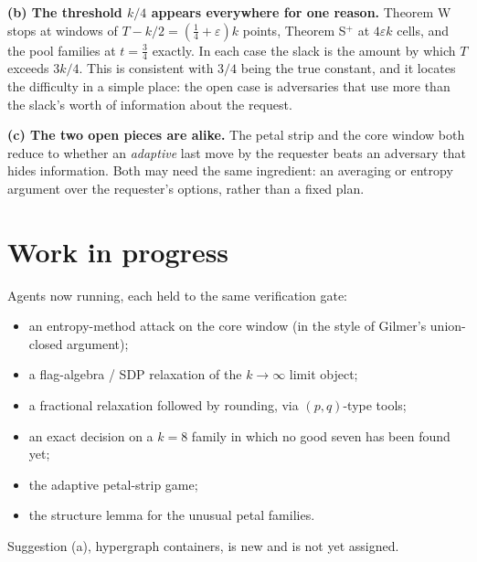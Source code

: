 \documentclass[11pt]{article}
\begin{document}
\textbf{(b) The threshold $k/4$ appears everywhere for one reason.} Theorem W stops at windows of $T-k/2=(\tfrac14+
\varepsilon)k$ points, Theorem S$^+$ at $4\varepsilon k$ cells, and the pool families at $t=\tfrac34$ exactly. In each
case the slack is the amount by which $T$ exceeds $3k/4$. This is consistent with $3/4$ being the true constant, and
it locates the difficulty in a simple place: the open case is adversaries that use more than the slack's worth of
information about the request.

\textbf{(c) The two open pieces are alike.} The petal strip and the core window both reduce to whether an
\emph{adaptive} last move by the requester beats an adversary that hides information. Both may need the same
ingredient: an averaging or entropy argument over the requester's options, rather than a fixed plan.

\section{Work in progress}
Agents now running, each held to the same verification gate:
\begin{itemize}
\item an entropy-method attack on the core window (in the style of Gilmer's union-closed argument);
\item a flag-algebra / SDP relaxation of the $k\to\infty$ limit object;
\item a fractional relaxation followed by rounding, via $(p,q)$-type tools;
\item an exact decision on a $k=8$ family in which no good seven has been found yet;
\item the adaptive petal-strip game;
\item the structure lemma for the unusual petal families.
\end{itemize}
Suggestion (a), hypergraph containers, is new and is not yet assigned.
\end{document}
